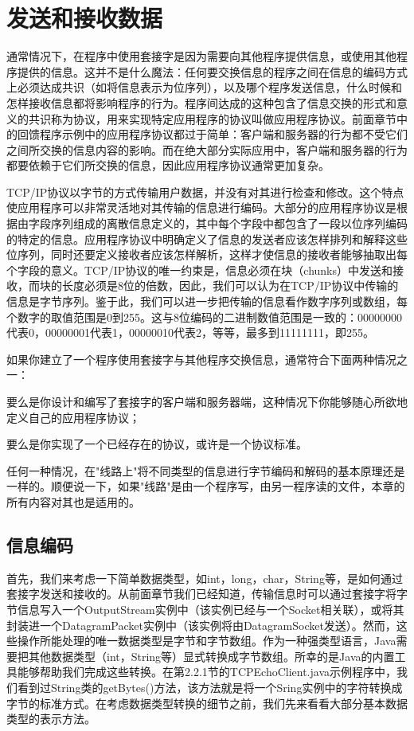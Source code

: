\chapter{发送和接收数据}

通常情况下，在程序中使用套接字是因为需要向其他程序提供信息，或使用其他程序提供的信息。这并不是什么魔法：任何要交换信息的程序之间在信息的编码方式上必须达成共识（如将信息表示为位序列），以及哪个程序发送信息，什么时候和怎样接收信息都将影响程序的行为。程序间达成的这种包含了信息交换的形式和意义的共识称为协议，用来实现特定应用程序的协议叫做应用程序协议。前面章节中的回馈程序示例中的应用程序协议都过于简单：客户端和服务器的行为都不受它们之间所交换的信息内容的影响。而在绝大部分实际应用中，客户端和服务器的行为都要依赖于它们所交换的信息，因此应用程序协议通常更加复杂。 

TCP/IP协议以字节的方式传输用户数据，并没有对其进行检查和修改。这个特点使应用程序可以非常灵活地对其传输的信息进行编码。大部分的应用程序协议是根据由字段序列组成的离散信息定义的，其中每个字段中都包含了一段以位序列编码的特定的信息。应用程序协议中明确定义了信息的发送者应该怎样排列和解释这些位序列，同时还要定义接收者应该怎样解析，这样才使信息的接收者能够抽取出每个字段的意义。TCP/IP协议的唯一约束是，信息必须在块（chunks）中发送和接收，而块的长度必须是8位的倍数，因此，我们可以认为在TCP/IP协议中传输的信息是字节序列。鉴于此，我们可以进一步把传输的信息看作数字序列或数组，每个数字的取值范围是0到255。这与8位编码的二进制数值范围是一致的：00000000代表0，00000001代表1，00000010代表2，等等，最多到11111111，即255。 

如果你建立了一个程序使用套接字与其他程序交换信息，通常符合下面两种情况之一：

要么是你设计和编写了套接字的客户端和服务器端，这种情况下你能够随心所欲地定义自己的应用程序协议；

要么是你实现了一个已经存在的协议，或许是一个协议标准。

任何一种情况，在"线路上"将不同类型的信息进行字节编码和解码的基本原理还是一样的。顺便说一下，如果"线路"是由一个程序写，由另一程序读的文件，本章的所有内容对其也是适用的。 

\section{信息编码} 

	首先，我们来考虑一下简单数据类型，如int，long，char，String等，是如何通过套接字发送和接收的。从前面章节我们已经知道，传输信息时可以通过套接字将字节信息写入一个OutputStream实例中（该实例已经与一个Socket相关联），或将其封装进一个DatagramPacket实例中（该实例将由DatagramSocket发送）。然而，这些操作所能处理的唯一数据类型是字节和字节数组。作为一种强类型语言，Java需要把其他数据类型（int，String等）显式转换成字节数组。所幸的是Java的内置工具能够帮助我们完成这些转换。在第2.2.1节的TCPEchoClient.java示例程序中，我们看到过String类的getBytes()方法，该方法就是将一个Sring实例中的字符转换成字节的标准方式。在考虑数据类型转换的细节之前，我们先来看看大部分基本数据类型的表示方法。 

